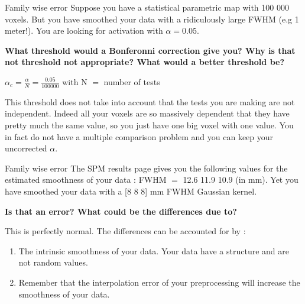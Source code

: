 \documentclass{beamer}
\begin{document}
\begin{frame}{Family wise error}
Suppose you have a statistical parametric map with 100 000 voxels. \linebreak
But you have smoothed your data with a ridiculously large FWHM (e.g 1 meter!). You are looking for activation with $\alpha = 0.05$. \linebreak

\textbf{What threshold would a Bonferonni correction give you? Why is that not threshold not appropriate? What would a better threshold be?}
    
\vfill
\begin{center}
 $\alpha_{c} = \frac{\alpha}{N} = \frac{0.05}{100000}$ with N $=$ number of tests
\end{center}

\vfill
This threshold does not take into account that the tests you are making are not independent. \linebreak
Indeed all your voxels are so massively dependent that they have pretty much the same value, so you just have one big voxel with one value. \linebreak
You in fact do not have a multiple comparison problem and you can keep your uncorrected $\alpha$.
\end{frame}


\begin{frame}{Family wise error}
The SPM results page gives you the following values for the estimated smoothness of your data : FWHM $=$ 12.6 11.9 10.9 (in mm). Yet you have smoothed your data with a [8 8 8] mm FWHM Gaussian kernel. \linebreak

\textbf{Is that an error? What could be the differences due to?}

\bigskip
This is perfectly normal. The differences can be accounted for by :

\smallskip
  \begin{enumerate}
    \item The intrinsic smoothness of your data. Your data have a structure and are not random values.
    \item Remember that the interpolation error of your preprocessing will increase the smoothness of your data.
  \end{enumerate}
\end{frame}


\end{document}
